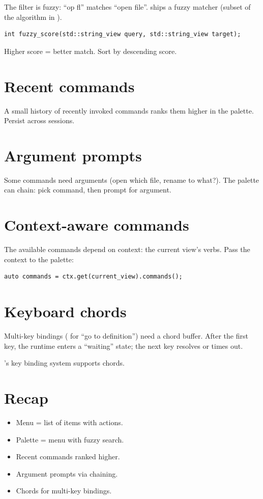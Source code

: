 The filter is fuzzy: ``op fl'' matches ``open file''. \maya{}
ships a fuzzy matcher (subset of the algorithm in
).

\begin{lstlisting}
int fuzzy_score(std::string_view query, std::string_view target);
\end{lstlisting}

Higher score = better match. Sort by descending score.

\section{Recent commands}

A small history of recently invoked commands ranks them
higher in the palette. Persist across sessions.

\section{Argument prompts}

Some commands need arguments (open which file, rename to
what?). The palette can chain: pick command, then prompt
for argument.

\section{Context-aware commands}

The available commands depend on context: the current
view's verbs. Pass the context to the palette:

\begin{lstlisting}
auto commands = ctx.get(current_view).commands();
\end{lstlisting}

\section{Keyboard chords}

Multi-key bindings ( for ``go to definition'') need
a chord buffer. After the first key, the runtime enters a
``waiting'' state; the next key resolves or times out.

\maya{}'s key binding system supports chords.

\section{Recap}

\begin{recap}
\begin{itemize}[leftmargin=*]
  \item Menu = list of items with actions.
  \item Palette = menu with fuzzy search.
  \item Recent commands ranked higher.
  \item Argument prompts via chaining.
  \item Chords for multi-key bindings.
\end{itemize}
\end{recap}

